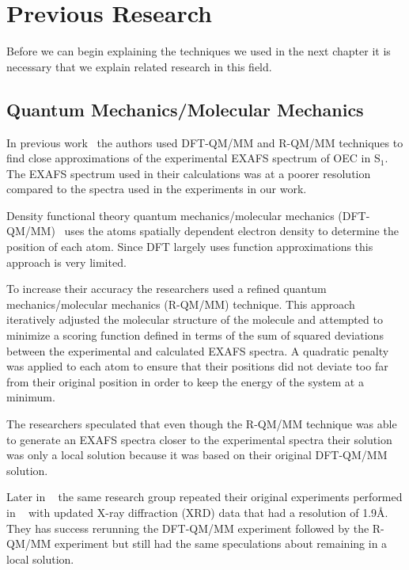 \chapter{Previous Research}

Before we can begin explaining the techniques we used in the next chapter it is necessary that we explain related research in this field.

\section{Quantum Mechanics/Molecular Mechanics}

In previous work~\cite{sproviero2008model} the authors used DFT-QM/MM and R-QM/MM techniques to find close approximations of the experimental EXAFS spectrum of OEC in S$_{1}$. The EXAFS spectrum used in their calculations was at a poorer resolution compared to the spectra used in the experiments in our work.

Density functional theory quantum mechanics/molecular mechanics (DFT-QM/MM)~\cite{parr1989density} uses the atoms spatially dependent electron density to determine the position of each atom. Since DFT largely uses function approximations this approach is very limited.

To increase their accuracy the researchers used a refined quantum mechanics/molecular mechanics (R-QM/MM) technique. This approach iteratively adjusted the molecular structure of the molecule and attempted to minimize a scoring function defined in terms of the sum of squared deviations between the experimental and calculated EXAFS spectra. A quadratic penalty was applied to each atom to ensure that their positions did not deviate too far from their original position in order to keep the energy of the system at a minimum.

The researchers speculated that even though the R-QM/MM technique was able to generate an EXAFS spectra closer to the experimental spectra their solution was only a local solution because it was based on their original DFT-QM/MM solution.

Later in ~\cite{luber2011s1} the same research group repeated their original experiments performed in ~\cite{sproviero2008model} with updated X-ray diffraction (XRD) data that had a resolution of 1.9\AA. They has success rerunning the DFT-QM/MM experiment followed by the R-QM/MM experiment but still had the same speculations about remaining in a local solution.
